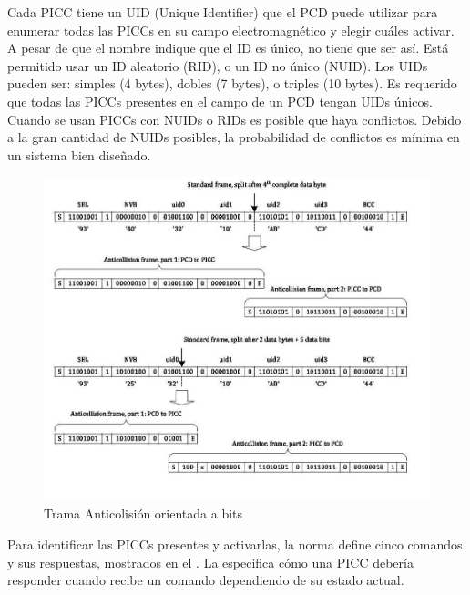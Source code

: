 \documentclass[a4paper, twoside, 11pt]{report}
\begin{document}
Cada PICC tiene un UID (Unique Identifier) que el PCD puede utilizar para enumerar todas las PICCs en su campo electromagnético y elegir cuáles activar. A pesar de que el nombre indique que el ID es único, no tiene que ser así. Está permitido usar un ID aleatorio (RID), o un ID no único (NUID). Los UIDs pueden ser: simples (4 bytes), dobles (7 bytes), o triples (10 bytes). Es requerido que todas las PICCs presentes en el campo de un PCD tengan UIDs únicos. Cuando se usan PICCs con NUIDs o RIDs es posible que haya conflictos. Debido a la gran cantidad de NUIDs posibles, la probabilidad de conflictos es mínima en un sistema bien diseñado.

\begin{figure}[htb]
  \centering
  \includegraphics[scale=0.5]{./img/anticollision_frames}
  \caption{Trama Anticolisión orientada a bits~\cite[Adaptado de][]{iso14443-3}}
  \label{fig:anticollision}
\end{figure}

Para identificar las PICCs presentes y activarlas, la norma define cinco comandos y sus respuestas, mostrados en el . La  especifica cómo una PICC debería responder cuando recibe un comando dependiendo de su estado actual.
\end{document}
